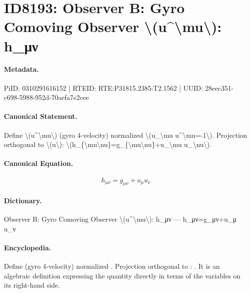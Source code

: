 \section*{ID8193: Observer B: Gyro Comoving Observer \textbackslash{}(u\textasciicircum{}\textbackslash{}mu\textbackslash{}): h\_μν}
\paragraph{Metadata.}
PiID: 0310291616152 | RTEID: RTE:P31815.2385:T2.1562 | UUID: 28eec351-c698-5988-952d-70aefa7e2cee

\paragraph{Canonical Statement.}
Define \textbackslash{}(u\textasciicircum{}\textbackslash{}mu\textbackslash{}) (gyro 4-velocity) normalized \textbackslash{}(u\_\textbackslash{}mu u\textasciicircum{}\textbackslash{}mu=-1\textbackslash{}). Projection orthogonal to \textbackslash{}(u\textbackslash{}): \textbackslash{}(h\_\{\textbackslash{}mu\textbackslash{}nu\}=g\_\{\textbackslash{}mu\textbackslash{}nu\}+u\_\textbackslash{}mu u\_\textbackslash{}nu\textbackslash{}).

\paragraph{Canonical Equation.}
\[
h_{\mu\nu}=g_{\mu\nu}+u_\mu u_\nu
\]

\paragraph{Dictionary.}
Observer B: Gyro Comoving Observer \textbackslash{}(u\textasciicircum{}\textbackslash{}mu\textbackslash{}): h\_μν — h\_μν=g\_μν+u\_μ u\_ν

\paragraph{Encyclopedia.}
Define (gyro 4-velocity) normalized . Projection orthogonal to : . It is an algebraic definition expressing the quantity directly in terms of the variables on its right-hand side.
